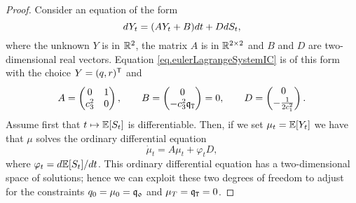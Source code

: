 \documentclass[10pt,a4paper]{article}
\begin{document}
\begin{proof}
Consider an equation of the form
\begin{equation*}
dY_t = (AY_t + B)dt + D dS_t,
\end{equation*}
where the unknown $Y$ is in $\mathbb{R}^{2}$, the matrix $A$ is in $\mathbb{R}^{2\times 2}$ and $B$ and $D$ are two-dimensional real vectors. Equation \eqref{eq.eulerLagrangeSystemIC} is of this form with the choice $Y=(q,r)^{\mathsf{T}}$ and
\begin{equation*}
A=
\begin{pmatrix}
0 & 1 \\ 
c_{3}^{2} & 0 
\end{pmatrix}, \qquad
B= 
\begin{pmatrix}
0 \\ -c_{3}^{2} \mathfrak{q}_{\mathtt{T} }
\end{pmatrix}
 = 0, \qquad
D= 
\begin{pmatrix}
0 \\ -\frac{1}{2c_{1}^{2}}
\end{pmatrix}.
\end{equation*} 
Assume first that $t\mapsto \mathbb{{E}}[S_t]$ is differentiable. Then, if we set $\mu_t=\mathbb{{E}}[Y_t]$ we have that $\mu$ solves the ordinary differential equation
\begin{equation}\label{eq.ODEforExpectedInventory}
\dot{\mu}_t = A\mu_t + \varphi_t D,
\end{equation}
where $\varphi_t= d\mathbb{{E}}[S_t]/dt$. This ordinary differential equation has a two-dimensional space of solutions; hence we can exploit these two degrees of freedom to adjust for the constraints $q_0 = \mu_0 = \mathfrak{q_0}$ and $\mu_T  = \mathfrak{q}_{\mathtt{T} } = 0$. 


\end{proof}
\end{document}
